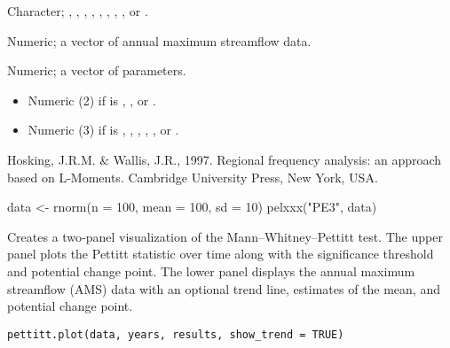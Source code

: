 \documentclass[a4paper]{book}
\begin{document}
%
\begin{Arguments}
\begin{ldescription}
\item[\code{model}] Character; , , , , , ,
, , or .

\item[\code{data}] Numeric; a vector of annual maximum streamflow data.
\end{ldescription}
\end{Arguments}
%
\begin{Value}
Numeric; a vector of parameters.
\begin{itemize}

\item{} Numeric (2) if  is , , or .
\item{} Numeric (3) if  is , , , , , or .

\end{itemize}

\end{Value}
%
\begin{References}
Hosking, J.R.M. \& Wallis, J.R., 1997. Regional frequency analysis: an approach based
on L-Moments. Cambridge University Press, New York, USA.
\end{References}
%
\begin{Examples}
\begin{ExampleCode}
data <- rnorm(n = 100, mean = 100, sd = 10)
pelxxx("PE3", data)

\end{ExampleCode}
\end{Examples}
%
\begin{Description}
Creates a two‐panel visualization of the Mann–Whitney–Pettitt test. The
upper panel plots the Pettitt  statistic over time along with the
significance threshold and potential change point. The lower panel displays
the annual maximum streamflow (AMS) data with an optional trend line,
estimates of the mean, and potential change point.
\end{Description}
%
\begin{Usage}
\begin{verbatim}
pettitt.plot(data, years, results, show_trend = TRUE)
\end{verbatim}
\end{Usage}
\end{document}
